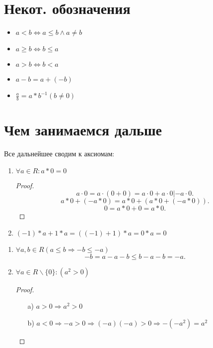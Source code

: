 \section{Некот. обозначения}
\begin{itemize}
    \item $a < b \iff a \leq b  \land  a \neq b$
    \item $a \geq b \iff b \leq a$
    \item $a > b \iff b < a$
    \item $ a - b = a + (-b) $
    \item $\frac{a}{b} = a * b^{-1} (b\neq0)$
\end{itemize}

\section{Чем занимаемся дальше}
Все дальнейшее сводим к аксиомам:
\begin{example}
\begin{enumerate}
    \item $\forall a  \in R \colon a * 0 = 0$
        \begin{proof}
            \[
        a \cdot  0 = a \cdot (0 + 0) = a \cdot  0 + a \cdot  0     | -a\cdot  0
            .\] 
            \[
            a * 0 + (-a * 0) = a * 0 + (a * 0 + (-a * 0))
            .\] 
            \[
            0 = a * 0 + 0 = a * 0
            .\] 
        \end{proof}
    \item $(-1) * a + 1 * a = ((-1) + 1) * a = 0 * a = 0$
\end{enumerate}
\end{example}
\begin{example}
\begin{enumerate}
    \item $\forall a, b  \in R (a \leq b \Rightarrow -b \leq -a)$ 
        \[
        -b = a - a - b \leq b - a - b = -a
        .\] 
    \item $\forall a  \in  R \backslash \{0\} \colon  (a^{2} > 0)$ 
        \begin{proof}
        \begin{itemize}
            \item [a) ] $a > 0 \Rightarrow a^{2} > 0$
            \item [b) ] $a < 0 \Rightarrow -a > 0 \Rightarrow (-a)(-a) > 0 \Rightarrow -(-a^{2}) = a^{2}$
        \end{itemize}
        \end{proof}
        
\end{enumerate}
\end{example}

